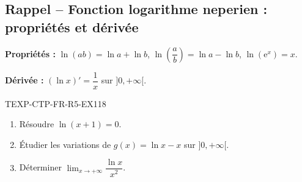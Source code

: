 

\subsection*{Rappel -- Fonction logarithme neperien : propriétés et dérivée}

\textbf{Propriétés :} $\ln(ab) = \ln a + \ln b$, $\ln\left(\dfrac{a}{b}\right) = \ln a - \ln b$, $\ln(\mathrm{e}^x) = x$.

\textbf{Dérivée :} $(\ln x)' = \dfrac{1}{x}$ sur $]0, +\infty[$.

\begin{exercice}{TEXP-CTP-FR-R5-EX1}{1}{8}
\begin{enumerate}
  \item Résoudre $\ln(x + 1) = 0$.
  \item Étudier les variations de $g(x) = \ln x - x$ sur $]0, +\infty[$.
  \item Déterminer $\lim_{x \to +\infty} \dfrac{\ln x}{x^2}$.
\end{enumerate}
\end{exercice}

